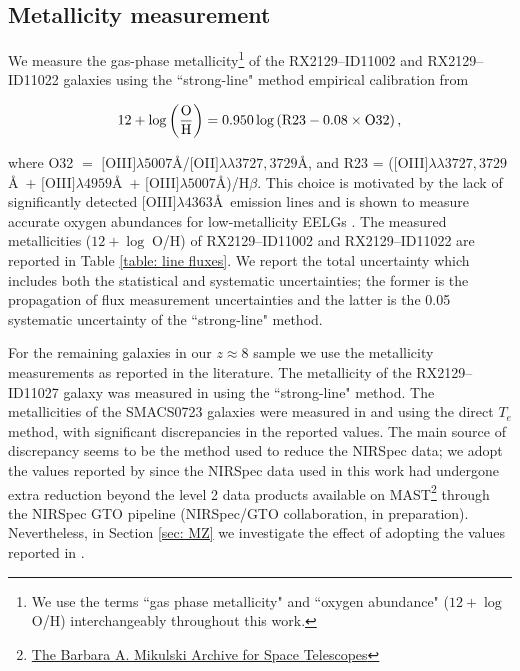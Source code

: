 \documentclass[twocolumn]{aastex631}
\begin{document}
\subsection{Metallicity measurement} \label{sec: metallicity}

We measure the gas-phase metallicity\footnote{We use the terms ``gas phase metallicity" and ``oxygen abundance" ($12 + \log\;$O/H) interchangeably throughout this work.} of the RX2129--ID11002 and RX2129--ID11022 galaxies using the ``strong-line" method empirical calibration from \cite{izotov+2019} 

\begin{equation}
    12 + \log\left (\frac{\textnormal{O}}{\textnormal{H}}\right) = 0.950 \log\left(\textnormal{R23} - 0.08 \times \textnormal{O32}\right),
\label{eq: metallicity}
\end{equation}

\noindent
where O32 $=$ $[$O{\footnotesize\;III}$]\lambda 5007$\AA/$[$O{\footnotesize\;II}$]\lambda \lambda 3727, 3729$\AA, and R23 = ($[$O{\footnotesize\;III}$]\lambda \lambda 3727,3729$\AA\ + $[$O{\footnotesize\;III}$]\lambda 4959$\AA\ + $[$O{\footnotesize\;III}$]\lambda 5007$\AA)/H$\beta$. This choice is motivated by the lack of significantly detected $[$O{\footnotesize\;III}$]\lambda 4363$\AA\ emission lines and is shown to measure accurate oxygen abundances for low-metallicity EELGs \citep[see][for a full discussion]{izotov+2019}. The measured metallicities ($12 + \log\;$O/H) of RX2129--ID11002 and RX2129--ID11022 are reported in Table \ref{table: line fluxes}. We report the total uncertainty which includes both the statistical and systematic uncertainties; the former is the propagation of flux measurement uncertainties and the latter is the 0.05 systematic uncertainty of the \cite{izotov+2019} ``strong-line" method.

For the remaining galaxies in our $z \approx 8$ sample we use the metallicity measurements as reported in the literature. The metallicity of the RX2129--ID11027 galaxy was measured in \cite{williams+2022} using the ``strong-line" method. The metallicities of the SMACS0723 galaxies were measured in \cite{curti+2022} and \cite{schaerer+2022} using the direct $T_e$ method, with significant discrepancies in the reported values. The main source of discrepancy seems to be the method used to reduce the NIRSpec data; we adopt the values reported by \cite{curti+2022} since the NIRSpec data used in this work had undergone extra reduction beyond the level 2 data products available on MAST\footnote{\href{https://archive.stsci.edu}{The Barbara A. Mikulski Archive for Space Telescopes}} through the NIRSpec GTO pipeline (NIRSpec/GTO collaboration, in preparation). Nevertheless, in Section \ref{sec: MZ} we investigate the effect of adopting the values reported in \cite{schaerer+2022}. 
\end{document}
